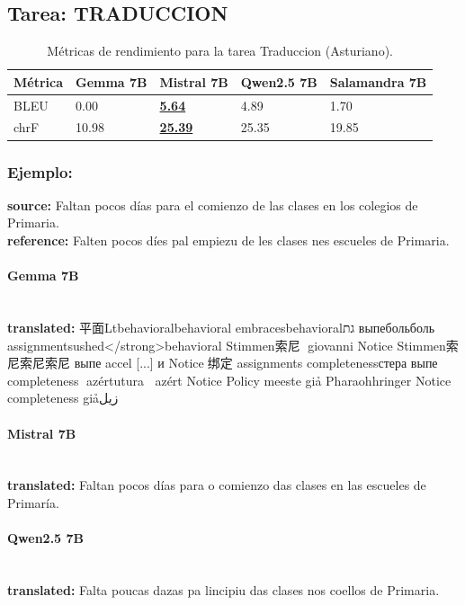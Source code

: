 \subsection{Tarea: TRADUCCION}\label{tarea-traduccion}
\begin{longtable}[]{@{}lllll@{}}
\toprule\noalign{}
Métrica & Gemma 7B & Mistral 7B & Qwen2.5 7B & Salamandra 7B \\
\midrule\noalign{}
\endhead
\bottomrule\noalign{}
\caption{Métricas de rendimiento para la tarea Traduccion (Asturiano).}
\label{tab:metricas_traduccion_Asturiano}
\endlastfoot
BLEU & 0.00 & \textbf{\underline{5.64}} & 4.89 & 1.70 \\
chrF & 10.98 & \textbf{\underline{25.39}} & 25.35 & 19.85 \\
\end{longtable}

\subsubsection{Ejemplo:}
\textbf{source:} Faltan pocos días para el comienzo de las clases en los colegios de Primaria.\\
\textbf{reference:} Falten pocos díes pal empiezu de les clases nes escueles de Primaria.

\paragraph{Gemma 7B}~\\
\textbf{translated:} 平面Ltbehavioralbehavioral embracesbehavioralגת выпебольболь assignmentsushed{\textless}/strong{\textgreater}behavioral Stimmen索尼🥈 giovanni Notice Stimmen索尼索尼索尼 выпе accel [...] и Notice🥈绑定 assignments completenessстера выпе completeness🥈 azértutura🥈🥈 azért Notice Policy meeste giả Pharaohhringer Notice completeness giảزيل

\paragraph{Mistral 7B}~\\
\textbf{translated:} Faltan pocos días para o comienzo das clases en las escueles de Primaría.

\paragraph{Qwen2.5 7B}~\\
\textbf{translated:} Falta poucas dazas pa l\textquotesingle{}incipiu das clases nos coellos de Primaria.

